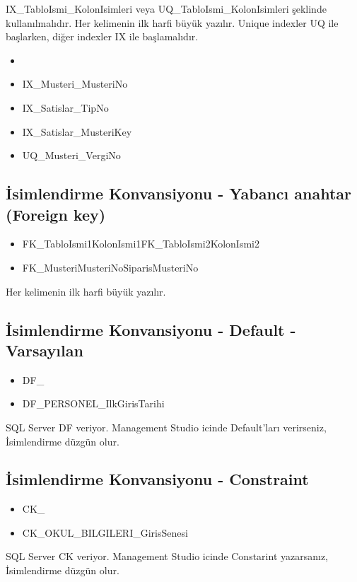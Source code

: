 \documentclass[10pt,a4paper,draft]{article}
\begin{document}
IX\_TabloIsmi\_KolonIsimleri  veya UQ\_TabloIsmi\_KolonIsimleri şeklinde kullanılmalıdır.
Her kelimenin ilk harfi büyük yazılır.
Unique indexler UQ ile başlarken, diğer indexler IX ile başlamalıdır.


\begin{itemize}
\item 
\item IX\_Musteri\_MusteriNo
\item IX\_Satislar\_TipNo
\item IX\_Satislar\_MusteriKey
\item UQ\_Musteri\_VergiNo

\end{itemize}  






\subsection{İsimlendirme Konvansiyonu - Yabancı anahtar (Foreign key)}  
\begin{itemize}
\item  FK\_TabloIsmi1KolonIsmi1FK\_TabloIsmi2KolonIsmi2 
\item FK\_MusteriMusteriNoSiparisMusteriNo
\end{itemize}
Her kelimenin ilk harfi büyük yazılır. 
  
\subsection{İsimlendirme Konvansiyonu - Default - Varsayılan}  
\begin{itemize}
\item DF\_
\item DF\_PERSONEL\_IlkGirisTarihi 
\end{itemize}  
  
SQL Server DF veriyor. Management Studio icinde Default'ları verirseniz, İsimlendirme düzgün olur. 		  

\subsection{İsimlendirme Konvansiyonu - Constraint }  
\begin{itemize}
\item CK\_
\item CK\_OKUL\_BILGILERI\_GirisSenesi  
\end{itemize}  
  
SQL Server CK veriyor. Management Studio icinde Constarint yazarsanız, İsimlendirme düzgün olur. 				 
  
\end{document}
